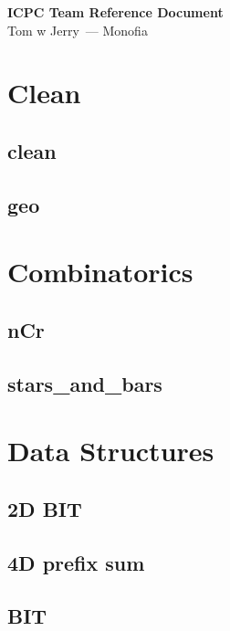 ﻿\documentclass[10pt,twocolumn]{article}
\newcommand{\TeamName}{Tom w Jerry}
\newcommand{\UniversityName}{Monofia}
\newcommand{\codefile}[1]{}}
\begin{document}
\begin{center}
    {\LARGE \textbf{ICPC Team Reference Document}}\\
    {\small \TeamName\ --- \UniversityName}
\end{center}
\vspace{0.25em}

\setcounter{tocdepth}{2}
\tableofcontents
\clearpage

\section{Clean}
\subsection{clean}
\codefile{Clean/clean.cpp}

\subsection{geo}
\codefile{Clean/geo.cpp}

\section{Combinatorics}
\subsection{nCr}
\codefile{Combinatorics/nCr.cpp}

\subsection{stars\_and\_bars}
\codefile{Combinatorics/stars_and_bars.cpp}

\section{Data Structures}
\subsection{2D BIT}
\codefile{Data Structure/2D BIT.cpp}

\subsection{4D prefix sum}
\codefile{Data Structure/4D prefix sum.cpp}

\subsection{BIT}
\codefile{Data Structure/BIT.cpp}
\end{document}
